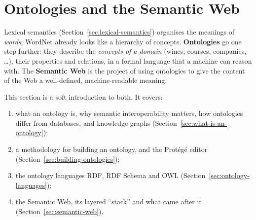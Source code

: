 \section{Ontologies and the Semantic Web}
\label{sec:ontologies}

Lexical semantics (Section~\ref{sec:lexical-semantics}) organises the meanings of
\emph{words}; WordNet already looks like a hierarchy of concepts. \textbf{Ontologies} go
one step further: they describe the \emph{concepts of a domain} (wines, courses,
companies, \ldots), their properties and relations, in a formal language that a machine
can reason with. The \textbf{Semantic Web} is the project of using ontologies to give the
content of the Web a well-defined, machine-readable meaning.

This section is a soft introduction to both. It covers:
\begin{enumerate}[nosep]
  \item what an ontology is, why semantic interoperability matters, how ontologies
        differ from databases, and knowledge graphs (Section~\ref{sec:what-is-an-ontology});
  \item a methodology for building an ontology, and the Protégé editor
        (Section~\ref{sec:building-ontologies});
  \item the ontology languages RDF, RDF Schema and OWL
        (Section~\ref{sec:ontology-languages});
  \item the Semantic Web, its layered ``stack'' and what came after it
        (Section~\ref{sec:semantic-web}).
\end{enumerate}





